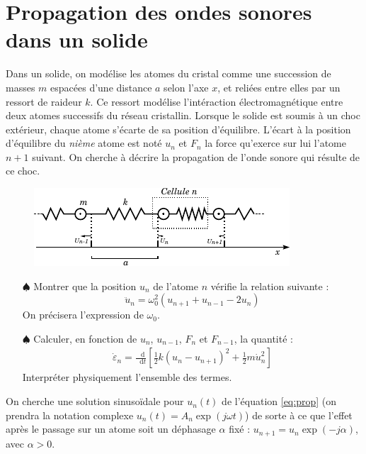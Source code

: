 \documentclass{report}
\newcommand*\dif{\mathop{}\!\mathrm{d}}
\begin{document}
\newpage

\section*{Propagation des ondes sonores dans un solide}

Dans un solide, on modélise les atomes du cristal comme une succession de masses $m$ espacées d'une distance $a$ selon l'axe $x$, et reliées entre elles par un ressort de raideur $k$. Ce ressort modélise l'intéraction électromagnétique entre deux atomes successifs du réseau cristallin. Lorsque le solide est soumis à un choc extérieur, chaque atome s'écarte de sa position d'équilibre. L'écart à la position d'équilibre du \textit{nième} atome est noté $u_n$ et $F_n$ la force qu'exerce sur lui l'atome $n+1$ suivant. On cherche à décrire la propagation de l'onde sonore qui résulte de ce choc.

\begin{figure}[h!]
\centering
	\includegraphics[scale=1.8]{onde_longitudinale.pdf}
\end{figure}

\begin{itemize}

	\item[$\spadesuit$] Montrer que la position $u_n$  de l'atome $n$ vérifie la relation suivante :
	\begin{equation}
		\ddot{u}_n=\omega_0^2(u_{n+1}+u_{n-1}-2u_n)
		\label{eq:prop}
	\end{equation}
	On précisera l'expression de $\omega_0$.
	
	 \item[$\spadesuit$] Calculer, en fonction de $u_n$, $u_{n-1}$, $F_n$ et $F_{n-1}$, la quantité :
	 \begin{align*}
	 	\dot{\varepsilon}_n = \frac{\dif}{\dif t}\left[ \frac{1}{2}k(u_n-u_{n+1})^2 + \frac{1}{2} m\dot{u}^2_n \right]
	 \end{align*}
	  Interpréter physiquement l'ensemble des termes.

\end{itemize}

On cherche une solution sinusoïdale pour $u_n(t)$ de l'équation \ref{eq:prop} (on prendra la notation complexe $u_n(t)=A_n\exp(j\omega t)$) de sorte à ce que l'effet après le passage sur un atome soit un déphasage $\alpha$ fixé : $u_{n+1}=u_n\exp(-j\alpha)$, avec $\alpha>0$.
\end{document}

